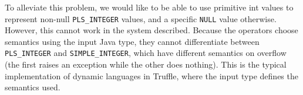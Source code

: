 \documentclass[twoside,11pt,a4paper]{article}
\newcommand{\maybe}[1]{\textit{(maybe ? #1)}}
\newcommand{\java}[1]{\textsf{#1}}
\newcommand{\pls}[1]{\small\texttt{#1}\normalsize}
\newcommand{\plstype}[1]{\pls{#1}}
\newcommand{\plsi}{\plstype{PLS\_INTEGER}}
\newcommand{\simpleint}{\plstype{SIMPLE\_INTEGER}}
\newcommand{\plsnull}{\pls{NULL}}
\begin{document}

To alleviate this problem, we would like to be able to use primitive \java{int} values to represent non-null \plsi{} values, and a specific \plsnull{} value otherwise. However, this cannot work in the system described. Because the operators choose semantics using the input Java type, they cannot differentiate between \plsi{} and \simpleint{}, which have different semantics on overflow (the first raises an exception while the other does nothing). This is the typical implementation of dynamic languages in Truffle, where the input type defines the semantics used.
\end{document}

